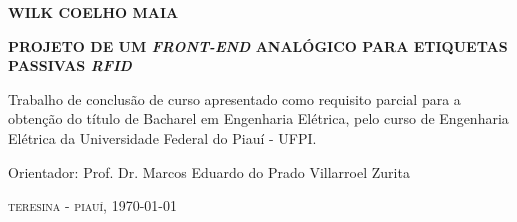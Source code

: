 \begin{center}
\textbf{\Large WILK COELHO MAIA}
\par
\vspace{4cm}
\textbf{\Large PROJETO DE UM \textit{FRONT-END} ANALÓGICO PARA ETIQUETAS PASSIVAS \textit{RFID}}
\end{center}
\par
\vspace{4cm}
\hspace*{160pt}\parbox{9cm}{{Trabalho de conclusão de curso apresentado como requisito parcial para a obtenção do título de Bacharel em Engenharia Elétrica, pelo curso de Engenharia Elétrica da Universidade Federal do Piauí - UFPI.}}
\vspace{2cm}
\par\hspace*{160pt}\parbox{10cm}{Orientador: Prof. Dr. Marcos Eduardo do Prado Villarroel Zurita}
\vfill
\begin{center}
\textsc{\large teresina - piauí, \today}\\
\end{center}
\newpage

